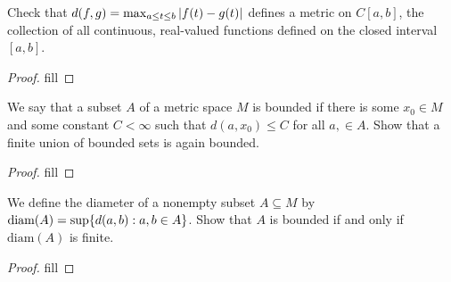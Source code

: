 \begin{exercise}{12}
Check that $d(f,g)=\max_{a\leq t\leq b}\left\lvert f(t)-g(t)\right\rvert$ defines a metric on $C[a,b]$, the collection of all continuous, real-valued functions defined on the closed interval $[a,b]$.
\end{exercise}
\begin{proof}
fill
\end{proof} 

\begin{exercise}{14}
We say that a subset $A$ of a metric space $M$ is bounded if there is some $x_0\in M$ and some constant $C<\infty$ such that $d(a,x_0)\leq C$ for all $a,\in A$. Show that a finite union of bounded sets is again bounded.
\end{exercise}
\begin{proof}
fill
\end{proof} 

\begin{exercise}{15}
We define the diameter of a nonempty subset $A\subseteq M$ by $\text{diam}(A)=\sup\{d(a,b):a,b\in A\}$. Show that $A$ is bounded if and only if $\text{diam}(A)$ is finite. 
\end{exercise}
\begin{proof}
fill
\end{proof} 
